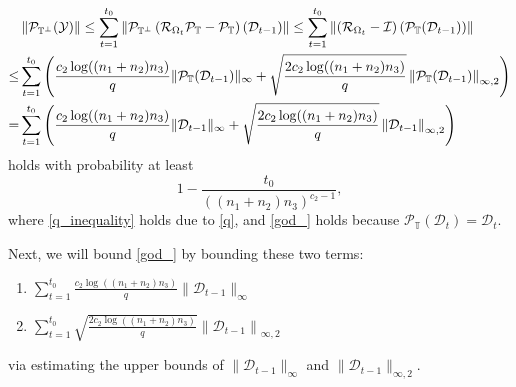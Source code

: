 \documentclass[twoside,12pt]{article}
\begin{document}
\begin{align}
& \left\|\mathcal{P}_{\mathbb{T}^{\perp}} (\mathcal{Y})\right\|  \leq \sum_{t=1}^{t_0}\left\|\mathcal{P}_{\mathbb{T}^{\perp}}\left(\mathcal{R}_{{\Omega}_t} \mathcal{P}_{\mathbb{T}}-\mathcal{P}_{\mathbb{T}}\right) (\mathcal{D}_{t-1})\right\|  
\leq \sum_{t=1}^{t_0}\left\|\left(\mathcal{R}_{{\Omega}_t}-\mathcal{I}\right)\left(\mathcal{P}_{\mathbb{T}} (\mathcal{D}_{t-1})\right)\right\| \notag\\
 \leq & \sum_{t=1}^{t_0}\left(\frac{c_{2}\log((n_1+n_2)n_3)}{q}\|\mathcal{P}_{\mathbb{T}}(\mathcal{D}_{t-1})\|_{\infty}+\sqrt{\frac{2c_{2}\log((n_1+n_2)n_3)}{q}}\left\|\mathcal{P}_{\mathbb{T}} (\mathcal{D}_{t-1})\right\|_{\infty,2}\right)\label{q_inequality}\\
= & \sum_{t=1}^{t_0}\left(\frac{c_{2}\log((n_1+n_2)n_3)}{q}\|\mathcal{D}_{t-1}\|_{\infty}+\sqrt{\frac{2c_{2}\log((n_1+n_2)n_3)}{q}}\left\|\mathcal{D}_{t-1}\right\|_{\infty,2}\right)\label{god_}
\end{align}
holds with probability at least 
\begin{equation}\label{eqn:probability4bound4proj}
    1-\frac{t_0} {((n_1+n_2)n_3)^{c_2-1}},
\end{equation}
where \eqref{q_inequality} holds due to \eqref{q}, and \eqref{god_} holds because $\mathcal{P}_{\mathbb{T}}(\mathcal{D}_{t}) = \mathcal{D}_{t}$.

Next, we will bound  \eqref{god_} by bounding   these two terms:
\begin{enumerate}[label=(\roman*),leftmargin=.5in]
    \item $\sum_{t=1}^{t_0}\frac{c_{2}\log((n_1+n_2)n_3)}{q}\|\mathcal{D}_{t-1}\|_{\infty}$ 
    \item $\sum_{t=1}^{t_0}\sqrt{\frac{2c_{2}\log((n_1+n_2)n_3)}{q}}\left\|\mathcal{D}_{t-1}\right\|_{\infty,2}$
\end{enumerate} via   estimating the upper bounds of $\|\mathcal{D}_{t-1}\|_{\infty}$ and $\|\mathcal{D}_{t-1}\|_{\infty,2}$.
\end{document}
